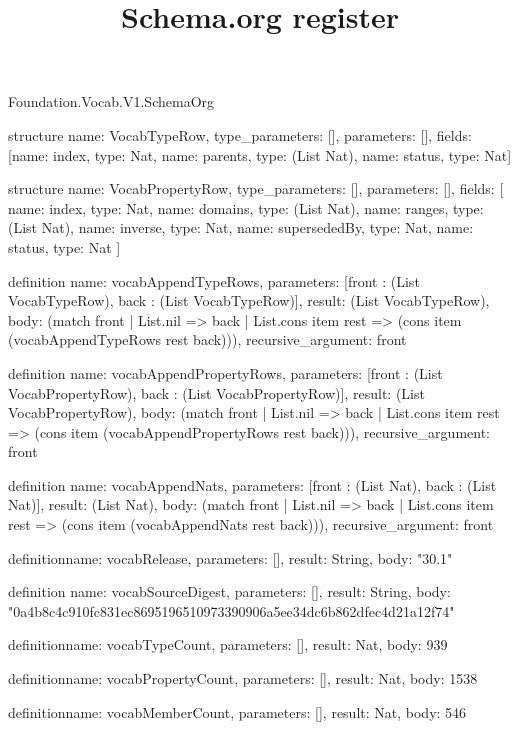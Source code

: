 \begin{lexlean}{Foundation.Vocab.V1.SchemaOrg}
\title{Schema.org register}
\begin{semanticmodule}
structure{
  name: VocabTypeRow,
  type_parameters: [],
  parameters: [],
  fields: [{name: index, type: Nat}, {name: parents, type: (List Nat)}, {name: status, type: Nat}]
}

structure{
  name: VocabPropertyRow,
  type_parameters: [],
  parameters: [],
  fields: [
    {name: index, type: Nat},
    {name: domains, type: (List Nat)},
    {name: ranges, type: (List Nat)},
    {name: inverse, type: Nat},
    {name: supersededBy, type: Nat},
    {name: status, type: Nat}
  ]
}

definition{
  name: vocabAppendTypeRows,
  parameters: [front : (List VocabTypeRow), back : (List VocabTypeRow)],
  result: (List VocabTypeRow),
  body: (match front
    | List.nil => back
    | List.cons item rest => (cons item (vocabAppendTypeRows rest back))),
  recursive_argument: front
}

definition{
  name: vocabAppendPropertyRows,
  parameters: [front : (List VocabPropertyRow), back : (List VocabPropertyRow)],
  result: (List VocabPropertyRow),
  body: (match front
    | List.nil => back
    | List.cons item rest => (cons item (vocabAppendPropertyRows rest back))),
  recursive_argument: front
}

definition{
  name: vocabAppendNats,
  parameters: [front : (List Nat), back : (List Nat)],
  result: (List Nat),
  body: (match front
    | List.nil => back
    | List.cons item rest => (cons item (vocabAppendNats rest back))),
  recursive_argument: front
}

definition{name: vocabRelease, parameters: [], result: String, body: "30.1"}

definition{
  name: vocabSourceDigest,
  parameters: [],
  result: String,
  body: "0a4b8c4c910fc831ec8695196510973390906a5ee34dc6b862dfec4d21a12f74"
}

definition{name: vocabTypeCount, parameters: [], result: Nat, body: 939}

definition{name: vocabPropertyCount, parameters: [], result: Nat, body: 1538}

definition{name: vocabMemberCount, parameters: [], result: Nat, body: 546}


\end{semanticmodule}
\end{lexlean}
